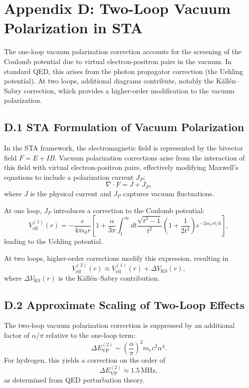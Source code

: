 \documentclass[12pt]{article}
\begin{document}
\section*{Appendix D: Two-Loop Vacuum Polarization in STA}

The one-loop vacuum polarization correction accounts for the screening of the Coulomb potential due to virtual electron-positron pairs in the vacuum. In standard QED, this arises from the photon propagator correction (the Uehling potential). At two loops, additional diagrams contribute, notably the Källén–Sabry correction, which provides a higher-order modification to the vacuum polarization.

\subsection*{D.1 STA Formulation of Vacuum Polarization}

In the STA framework, the electromagnetic field is represented by the bivector field \(F = E + I B\). Vacuum polarization corrections arise from the interaction of this field with virtual electron-positron pairs, effectively modifying Maxwell’s equations to include a polarization current \(J_P\):
\[
\nabla \cdot F = J + J_P,
\]
where \(J\) is the physical current and \(J_P\) captures vacuum fluctuations.

At one loop, \(J_P\) introduces a correction to the Coulomb potential:
\[
V_\text{eff}^{(1)}(r) = -\frac{e}{4\pi\epsilon_0 r} \left[1 + \frac{\alpha}{3\pi} \int_1^\infty dt \frac{\sqrt{t^2-1}}{t^2} \left(1+\frac{1}{2t^2}\right) e^{-2m_e r t/\hbar}\right],
\]
leading to the Uehling potential.  

At two loops, higher-order corrections modify this expression, resulting in
\[
V_\text{eff}^{(2)}(r) \approx V_\text{eff}^{(1)}(r) + \Delta V_\text{KS}(r),
\]
where \(\Delta V_\text{KS}(r)\) is the Källén–Sabry contribution.

\subsection*{D.2 Approximate Scaling of Two-Loop Effects}

The two-loop vacuum polarization correction is suppressed by an additional factor of \(\alpha/\pi\) relative to the one-loop term:
\[
\Delta E_\text{VP}^{(2)} \sim \left(\frac{\alpha}{\pi}\right)^2 m_e c^2 \alpha^4.
\]
For hydrogen, this yields a correction on the order of
\[
\Delta E_\text{VP}^{(2)} \approx 1.5\,\text{MHz},
\]
as determined from QED perturbation theory.
\end{document}
